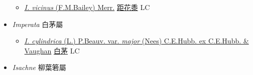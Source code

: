 \begin{itemize}
  \begin{itemize}
        \item[] \href{http://www.theplantlist.org/tpl1.1/search?q=Ichnanthus+vicinus}{\textit{I. vicinus} (F.M.Bailey) Merr.}   \href{\detokenize{http://taibnet.sinica.edu.tw/chi/taibnet_species_list.php?T2=距花黍&T2_new_value=true&fr=y}}{距花黍} LC
  \end{itemize}
 \item[] \textit{Imperata} 白茅屬
                    
  \begin{itemize}
        \item[] \href{http://www.theplantlist.org/tpl1.1/search?q=Imperata+cylindrica+var.+major}{\textit{I. cylindrica} (L.) P.Beauv. var. \textit{major} (Nees) C.E.Hubb. ex C.E.Hubb. \& Vaughan}   \href{\detokenize{http://taibnet.sinica.edu.tw/chi/taibnet_species_list.php?T2=白茅&T2_new_value=true&fr=y}}{白茅} LC
  \end{itemize}
 \item[] \textit{Isachne} 柳葉箬屬
                    

\end{itemize}
